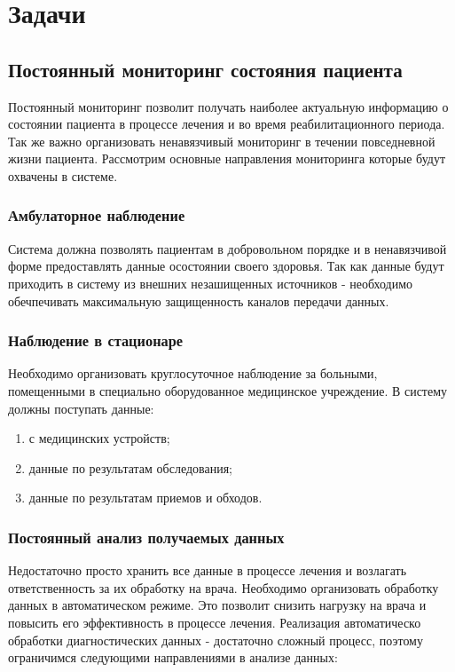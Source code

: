 \newpage
\section{Задачи}
\subsection{Постоянный мониторинг состояния пациента}

Постоянный мониторинг позволит получать наиболее актуальную информацию о
состоянии пациента в процессе лечения и во время реабилитационного периода. Так
же важно организовать ненавязчивый мониторинг в течении повседневной жизни
пациента. Рассмотрим основные направления мониторинга которые будут охвачены в
системе.

\subsubsection{Амбулаторное наблюдение}

Система должна позволять пациентам в добровольном порядке и в ненавязчивой форме
предоставлять данные осостоянии своего здоровья. Так как данные будут приходить
в систему из внешних незашищенных источников - необходимо обечпечивать
максимальную защищенность каналов передачи данных.

\subsubsection{Наблюдение в стационаре}

Необходимо организовать круглосуточное наблюдение за больными, помещенными в
специально оборудованное медицинское учреждение. В систему должны поступать
данные:

\begin{enumerate}
	\item с медицинских устройств;
	\item данные по результатам обследования;
	\item данные по результатам приемов и обходов.
\end{enumerate}

\subsubsection{Постоянный анализ получаемых данных}

Недостаточно просто хранить все данные в процессе лечения и возлагать
ответственность за их обработку на врача. Необходимо организовать обработку
данных в автоматическом режиме. Это позволит снизить нагрузку на врача и
повысить его эффективность в процессе лечения.
Реализация автоматическо обработки диагностических данных - достаточно сложный
процесс, поэтому ограничимся следующими направлениями в анализе данных:

